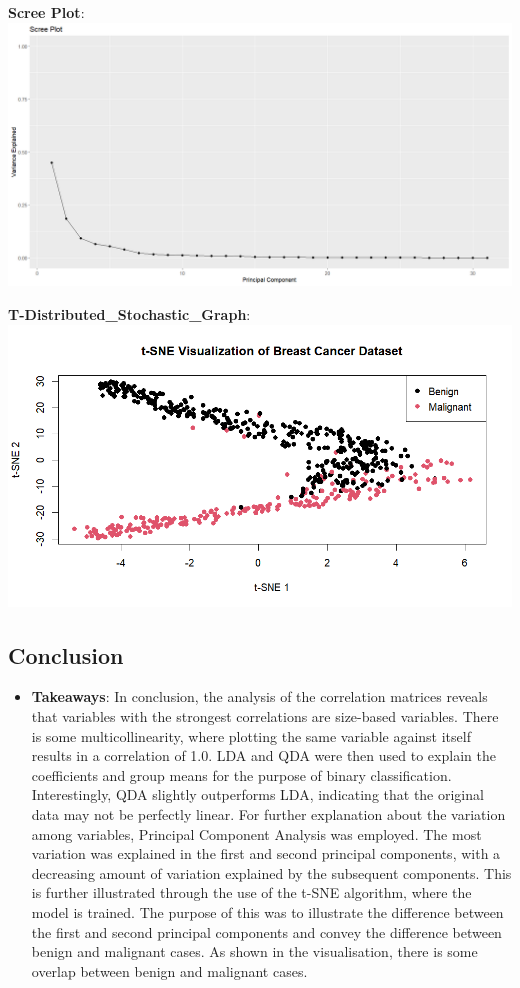 \documentclass[
]{article}
\providecommand{\tightlist}{%
  \setlength{\itemsep}{0pt}\setlength{\parskip}{0pt}}
\begin{document}
\textbf{Scree Plot}: \includegraphics{images/scree_plot_pca.png}

\textbf{T-Distributed\_Stochastic\_Graph}:
\includegraphics{images/t-distributed_stochastic_graph.png}

\subsection{Conclusion}\label{conclusion}

\begin{itemize}
\tightlist
\item
  \textbf{Takeaways}: In conclusion, the analysis of the correlation
  matrices reveals that variables with the strongest correlations are
  size-based variables. There is some multicollinearity, where plotting
  the same variable against itself results in a correlation of 1.0. LDA
  and QDA were then used to explain the coefficients and group means for
  the purpose of binary classification. Interestingly, QDA slightly
  outperforms LDA, indicating that the original data may not be
  perfectly linear. For further explanation about the variation among
  variables, Principal Component Analysis was employed. The most
  variation was explained in the first and second principal components,
  with a decreasing amount of variation explained by the subsequent
  components. This is further illustrated through the use of the t-SNE
  algorithm, where the model is trained. The purpose of this was to
  illustrate the difference between the first and second principal
  components and convey the difference between benign and malignant
  cases. As shown in the visualisation, there is some overlap between
  benign and malignant cases.
\end{itemize}
\end{document}

